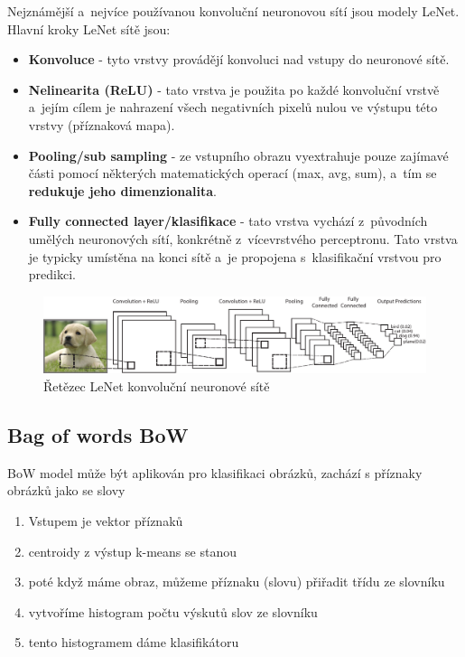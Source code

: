 Nejznámější a~nejvíce používanou konvoluční neuronovou sítí jsou modely LeNet.
Hlavní kroky LeNet sítě jsou:
\begin{itemize}
  \item{\textbf{Konvoluce} - tyto vrstvy provádějí konvoluci nad vstupy do neuronové sítě.}
  \item{\textbf{Nelinearita (ReLU)} - tato vrstva je použita po každé konvoluční vrstvě a~jejím cílem je nahrazení všech negativních pixelů nulou ve výstupu této vrstvy (příznaková mapa).}
  \item{\textbf{Pooling/sub sampling} - ze vstupního obrazu vyextrahuje pouze zajímavé části pomocí některých matematických operací (max, avg, sum), a~tím se \textbf{redukuje jeho dimenzionalita}.}
  \item{\textbf{Fully connected layer/klasifikace} - tato vrstva vychází z~původních umělých neuronových sítí, konkrétně z~vícevrstvého perceptronu. Tato vrstva je typicky umístěna na konci sítě a~je propojena s~klasifikační vrstvou pro predikci.}
\end{itemize}
\begin{figure}[H]
\centering
\includegraphics[width=1.1\linewidth]{assets/9_cnn.pdf}
\caption{Řetězec LeNet konvoluční neuronové sítě}
\label{fig:cnn}
\end{figure}

\subsection{Bag of words BoW}
BoW model může být aplikován pro klasifikaci obrázků, zachází s příznaky obrázků jako se slovy
\begin{enumerate}
\item Vstupem je vektor příznaků
\item centroidy z výstup k-means se stanou 
\item poté když máme obraz, můžeme příznaku (slovu) přiřadit třídu ze slovníku
\item vytvoříme histogram počtu výskutů slov ze slovníku
\item tento histogramem dáme klasifikátoru
\end{enumerate}
\fi